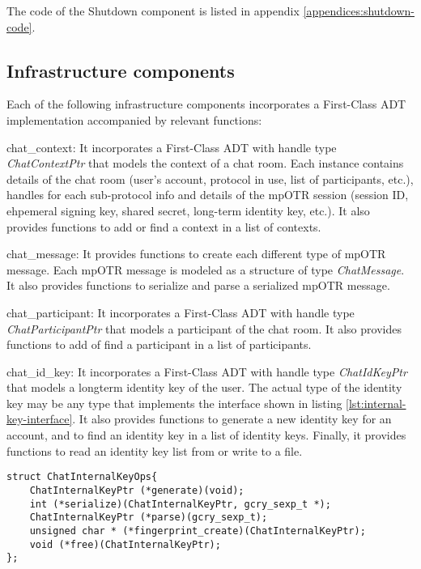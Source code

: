The code of the Shutdown component is listed in appendix \ref{appendices:shutdown-code}.

\subsection{Infrastructure components}
\label{section:infrastructure-components}
Each of the following infrastructure components incorporates a First-Class ADT implementation accompanied by relevant functions:

\begin{description}
  \item chat\_context: It incorporates a First-Class ADT with handle type \emph{ChatContextPtr} that models the context of a chat room. Each instance contains details of the chat room (user's account, protocol in use, list of participants, etc.), handles for each sub-protocol info and details of the mpOTR session (session ID, ehpemeral signing key, shared secret, long-term identity key, etc.). It also provides functions to add or find a context in a list of contexts.

  \item chat\_message: It provides functions to create each different type of mpOTR message. Each mpOTR message is modeled as a structure of type \emph{ChatMessage}. It also provides functions to serialize and parse a serialized mpOTR message.

  \item chat\_participant: It incorporates a First-Class ADT with handle type \emph{ChatParticipantPtr} that models a participant of the chat room. It also provides functions to add of find a participant in a list of participants.
  
  \item chat\_id\_key: It incorporates a First-Class ADT with handle type \emph{ChatIdKeyPtr} that models a longterm identity key of the user. The actual type of the identity key may be any type that implements the interface shown in listing \ref{lst:internal-key-interface}. It also provides functions to generate a new identity key for an account, and to find an identity key in a list of identity keys. Finally, it provides functions to read an identity key list from or write to a file.
  
\begin{lstlisting}[caption={Internal key interface},label={lst:internal-key-interface}]
struct ChatInternalKeyOps{
    ChatInternalKeyPtr (*generate)(void);
    int (*serialize)(ChatInternalKeyPtr, gcry_sexp_t *);
    ChatInternalKeyPtr (*parse)(gcry_sexp_t);
    unsigned char * (*fingerprint_create)(ChatInternalKeyPtr);
    void (*free)(ChatInternalKeyPtr);
};
\end{lstlisting}


\end{description}
